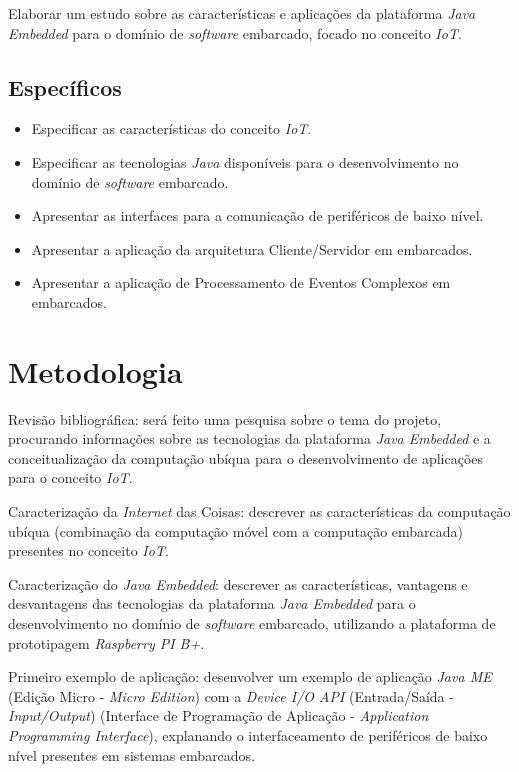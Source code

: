 Elaborar um estudo sobre as características e aplicações da plataforma
\textit{Java Embedded} para o domínio de \textit{software} embarcado, focado no
conceito \textit{IoT}.

\newpage
\subsection{Específicos}

\begin{itemize}

    \item Especificar as características do conceito \textit{IoT}.

    \item Especificar as tecnologias \textit{Java} disponíveis para o
      desenvolvimento no domínio de \textit{software} embarcado.

    \item Apresentar as interfaces para a comunicação de periféricos de baixo
    nível.

    \item Apresentar a aplicação da arquitetura Cliente/Servidor em
    embarcados.

    \item Apresentar a aplicação de Processamento de Eventos Complexos em
    embarcados.

\end{itemize}

\section{Metodologia}

Revisão bibliográfica: será feito uma pesquisa sobre o tema do projeto,
procurando informações sobre as tecnologias da plataforma \textit{Java
  Embedded} e a conceitualização da computação ubíqua para o desenvolvimento de
aplicações para o conceito \textit{IoT}.

Caracterização da \textit{Internet} das Coisas: descrever as características da
computação ubíqua (combinação da computação móvel com a computação embarcada)
presentes no conceito \textit{IoT}.

Caracterização do \textit{Java Embedded}: descrever as características,
vantagens e desvantagens das tecnologias da plataforma \textit{Java Embedded}
para o desenvolvimento no domínio de \textit{software} embarcado, utilizando a
plataforma de prototipagem \textit{Raspberry PI B+}.

Primeiro exemplo de aplicação: desenvolver um exemplo de aplicação \textit{Java
  ME} (Edição Micro - \textit{Micro Edition}) com a \textit{Device I/O API} (Entrada/Saída - \textit{Input/Output}) (Interface de Programação de Aplicação - \textit{Application Programming Interface}), explanando o interfaceamento de
periféricos de baixo nível presentes em sistemas embarcados.

